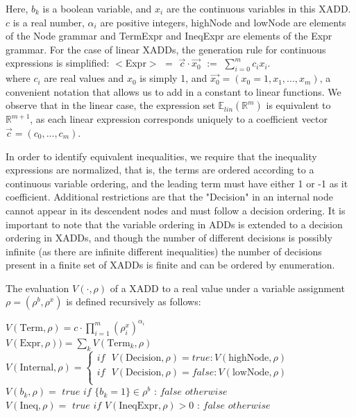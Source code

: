 Here, $b_k$ is a boolean variable, and $x_i$ are the continuous variables in this XADD. $c$ is a real number, $\alpha_i$ are positive integers, highNode and lowNode are elements of the Node grammar and TermExpr and IneqExpr are elements of the Expr grammar.
For the case of linear XADDs, the generation rule for continuous expressions is simplified: $<$Expr$>$ $=$ $\vec{c}\cdot\vec{x_0}$ $:=$ $\sum_{i=0}^m {c_i x_i}$.\\
where $c_i$ are real values and $x_0$ is simply 1, and $\vec{x_0} = (x_0 = 1 ,x_1,..., x_m)$, a convenient notation that allows us to add in a constant to linear functions. We observe that in the linear case, the expression set $\mathbb{E}_{lin}(\mathbb{R}^m)$ is equivalent to $\mathbb{R}^{m+1}$, as each linear expression corresponds uniquely to a coefficient vector $\vec{c} = (c_0, ..., c_m)$.

In order to identify equivalent inequalities, we require that the inequality expressions are normalized, that is, the terms are ordered according to a continuous variable ordering, and the leading term must have either 1 or -1 as it coefficient.
Additional restrictions are that the "Decision" in an internal node cannot appear in its descendent nodes and must follow a decision ordering. It is important to note that the variable ordering in ADDs is extended to a decision ordering in XADDs, and though the number of different decisions is possibly infinite (as there are infinite different inequalities) the number of decisions present in a finite set of XADDs is finite and can be ordered by enumeration.

The evaluation $V(\cdot, \rho)$ of a XADD to a real value under a variable assignment $\rho = (\rho^b,\rho^x)$ is defined recursively as follows:

{\footnotesize
$V(\text{Term},\rho) = c \cdot \prod_{i=1}^m { (\rho^x_i)^{\alpha_i}}$\\
$V(\text{Expr},\rho)) = \sum_k V(\text{Term}_k, \rho)$\\
$V(\text{Internal},\rho) = \begin{cases} 
if \text{ }V(\text{Decision},\rho) = true:  V(\text{highNode},\rho)\\
if \text{ }V(\text{Decision},\rho) = false:  V(\text{lowNode},\rho)\\
\end{cases} $\\
$V(b_k, \rho) =$ $true$ $if$ $\{ b_k = 1\} \in \rho^b$ : $false$ $otherwise$\\
$V(\text{Ineq},\rho) =$ $true$ $if$ $V(\text{IneqExpr},\rho) > 0 $ : $false$ $otherwise$\\
}

